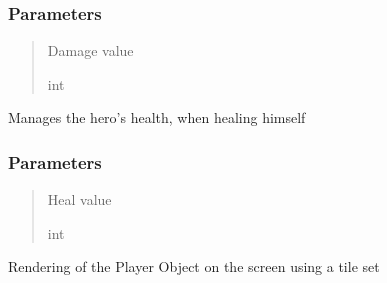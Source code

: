 \documentclass[letterpaper,10pt,english]{sphinxmanual}
\begin{document}
\begin{fulllineitems}
\begin{fulllineitems}
\subsubsection{Parameters}
\label{\detokenize{api_reference/dungeon_gui/Player:id1}}\begin{quote}\begin{description}
\sphinxAtStartPar
Damage value

\sphinxAtStartPar
int

\end{description}\end{quote}

\end{fulllineitems}


\begin{fulllineitems}
\label{\detokenize{api_reference/dungeon_gui/Player:Player.Player.get_heal}}
\pysigstartsignatures
{}
\pysigstopsignatures
\sphinxAtStartPar
Manages the hero’s health, when healing himself


\subsubsection{Parameters}
\label{\detokenize{api_reference/dungeon_gui/Player:id2}}\begin{quote}\begin{description}
\sphinxAtStartPar
Heal value

\sphinxAtStartPar
int

\end{description}\end{quote}

\end{fulllineitems}


\begin{fulllineitems}
\label{\detokenize{api_reference/dungeon_gui/Player:Player.Player.render_player}}
\pysigstartsignatures
{}
\pysigstopsignatures
\sphinxAtStartPar
Rendering of the Player Object on the screen using a tile set



\end{fulllineitems}
\end{fulllineitems}
\end{document}
